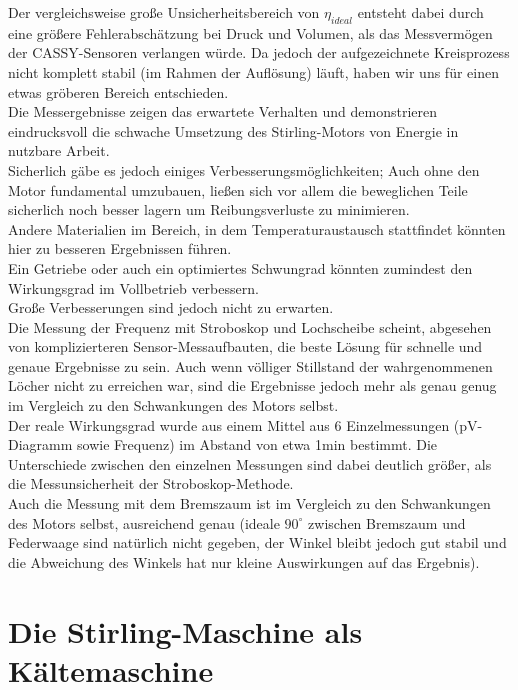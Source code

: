 \documentclass[12pt,a4paper]{article}
\begin{document}
\begin{multicols}{2}
\noindent Der vergleichsweise große Unsicherheitsbereich von $\eta_{ideal}$ entsteht dabei durch eine größere Fehlerabschätzung bei Druck und Volumen, als das Messvermögen der CASSY-Sensoren verlangen würde. Da jedoch der aufgezeichnete Kreisprozess nicht komplett stabil (im Rahmen der Auflösung) läuft, haben wir uns für einen etwas gröberen Bereich entschieden.\\

\noindent Die Messergebnisse zeigen das erwartete Verhalten und demonstrieren eindrucksvoll die schwache Umsetzung des Stirling-Motors von Energie in nutzbare Arbeit.\\
Sicherlich gäbe es jedoch einiges Verbesserungsmöglichkeiten; Auch ohne den Motor fundamental umzubauen, ließen sich vor allem die beweglichen Teile sicherlich noch besser lagern um Reibungsverluste zu minimieren.\\
Andere Materialien im Bereich, in dem Temperaturaustausch stattfindet könnten hier zu besseren Ergebnissen führen.\\
Ein Getriebe oder auch ein optimiertes Schwungrad könnten zumindest den Wirkungsgrad im Vollbetrieb verbessern.\\
Große Verbesserungen sind jedoch nicht zu erwarten.\\

\noindent Die Messung der Frequenz mit Stroboskop und Lochscheibe scheint, abgesehen von komplizierteren Sensor-Messaufbauten, die beste Lösung für schnelle und genaue Ergebnisse zu sein. Auch wenn völliger Stillstand der wahrgenommenen Löcher nicht zu erreichen war, sind die Ergebnisse jedoch mehr als genau genug im Vergleich zu den Schwankungen des Motors selbst.\\
Der reale Wirkungsgrad wurde aus einem Mittel aus 6 Einzelmessungen (pV-Diagramm sowie Frequenz) im Abstand von etwa 1min bestimmt. Die Unterschiede zwischen den einzelnen Messungen sind dabei deutlich größer, als die Messunsicherheit der Stroboskop-Methode.\\
Auch die Messung mit dem Bremszaum ist im Vergleich zu den Schwankungen des Motors selbst, ausreichend genau (ideale $90^\circ$ zwischen Bremszaum und Federwaage sind natürlich nicht gegeben, der Winkel bleibt jedoch gut stabil und die Abweichung des Winkels hat nur kleine Auswirkungen auf das Ergebnis).



\section{Die Stirling-Maschine als Kältemaschine}


\end{multicols}
\end{document}
